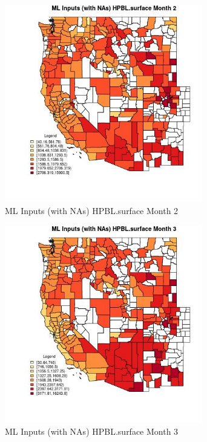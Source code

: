\begin{figure} 
\centering  
\includegraphics[width=0.77\textwidth]{Code_Outputs/Report_ML_input_PM25_Step4_part_f_de_duplicated_aves_prioritize_24hr_obswNAs_CountyHPBLsurfacemedianMonth2.jpg} 
\caption{\label{fig:Report_ML_input_PM25_Step4_part_f_de_duplicated_aves_prioritize_24hr_obswNAsCountyHPBLsurfacemedianMonth2}ML Inputs (with NAs) HPBL.surface Month 2} 
\end{figure} 
 

\begin{figure} 
\centering  
\includegraphics[width=0.77\textwidth]{Code_Outputs/Report_ML_input_PM25_Step4_part_f_de_duplicated_aves_prioritize_24hr_obswNAs_CountyHPBLsurfacemedianMonth3.jpg} 
\caption{\label{fig:Report_ML_input_PM25_Step4_part_f_de_duplicated_aves_prioritize_24hr_obswNAsCountyHPBLsurfacemedianMonth3}ML Inputs (with NAs) HPBL.surface Month 3} 
\end{figure} 
 

